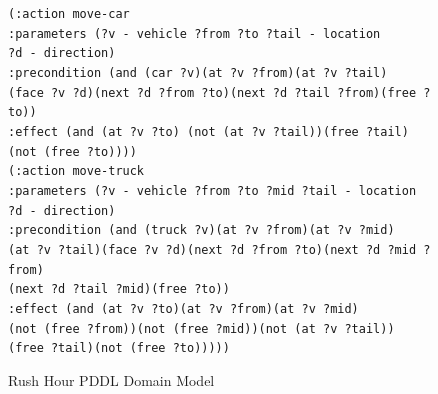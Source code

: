 \documentclass[doctor]{thesis} %
\theoremstyle{plain}
\begin{document}
\begin{figure}[!ht]
{{{\texttt{\hspace*{35pt}(:action move-car \\
                \hspace*{35pt}:parameters (?v - vehicle ?from ?to ?tail - location \\ \hspace*{35pt}?d - direction)\\
                \hspace*{35pt}:precondition (and (car ?v)(at ?v ?from)(at ?v ?tail)\\\hspace*{35pt}(face ?v ?d)(next ?d ?from ?to)(next ?d ?tail ?from)(free ?to))\\
                \hspace*{35pt}:effect (and (at ?v ?to) (not (at ?v ?tail))(free ?tail)\\\hspace*{35pt}(not (free ?to))))\\[15 pt]}
\texttt{\hspace*{35pt}(:action move-truck \\
                \hspace*{35pt}:parameters (?v - vehicle ?from ?to ?mid ?tail - location \\\hspace*{35pt}?d - direction)\\
                \hspace*{35pt}:precondition (and (truck ?v)(at ?v ?from)(at ?v ?mid)\\\hspace*{35pt}(at ?v ?tail)(face ?v ?d)(next ?d ?from ?to)(next ?d ?mid ?from)\\\hspace*{35pt}(next ?d ?tail ?mid)(free ?to))\\[0.25 pt]
                \hspace*{35pt}:effect (and (at ?v ?to)(at ?v ?from)(at ?v ?mid)\\\hspace*{35pt}(not (free ?from))(not (free ?mid))(not (at ?v ?tail))\\\hspace*{35pt}(free ?tail)(not (free ?to)))))
}
}
}
}
\caption{Rush Hour PDDL Domain Model}
\label{fig:domain}
\end{figure}
\end{document}
